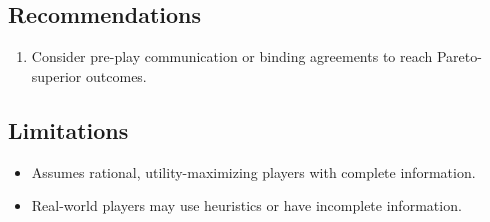 \documentclass[11pt, a4paper]{article}
\begin{document}


\subsection{Recommendations}

\begin{enumerate}
  \item Consider pre-play communication or binding agreements to reach Pareto-superior outcomes.
\end{enumerate}

\subsection{Limitations}

\begin{polyawarnbox}
\begin{itemize}
  \item Assumes rational, utility-maximizing players with complete information.
  \item Real-world players may use heuristics or have incomplete information.
\end{itemize}
\end{polyawarnbox}

\end{document}
